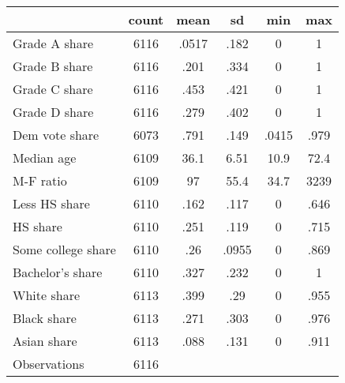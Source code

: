 {
\def\sym#1{\ifmmode^{#1}\else\(^{#1}\)\fi}
\begin{tabular}{l*{1}{ccccc}}
\toprule
                    &       count&        mean&          sd&         min&         max\\
\midrule
Grade A share       &        6116&       .0517&        .182&           0&           1\\
Grade B share       &        6116&        .201&        .334&           0&           1\\
Grade C share       &        6116&        .453&        .421&           0&           1\\
Grade D share       &        6116&        .279&        .402&           0&           1\\
Dem vote share      &        6073&        .791&        .149&       .0415&        .979\\
Median age          &        6109&        36.1&        6.51&        10.9&        72.4\\
M-F ratio           &        6109&          97&        55.4&        34.7&        3239\\
Less HS share       &        6110&        .162&        .117&           0&        .646\\
HS share            &        6110&        .251&        .119&           0&        .715\\
Some college share  &        6110&         .26&       .0955&           0&        .869\\
Bachelor's share    &        6110&        .327&        .232&           0&           1\\
White share         &        6113&        .399&         .29&           0&        .955\\
Black share         &        6113&        .271&        .303&           0&        .976\\
Asian share         &        6113&        .088&        .131&           0&        .911\\
\midrule
Observations        &        6116&            &            &            &            \\
\bottomrule
\end{tabular}
}
